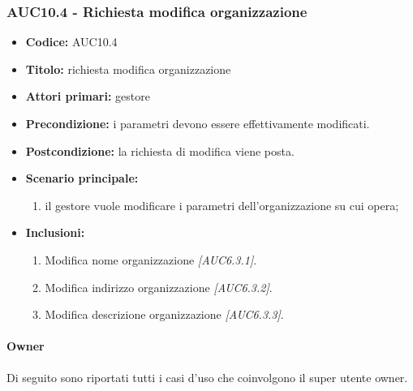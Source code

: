 \documentclass[casi-duso]{subfiles}
\begin{document}
\subsubsection{AUC10.4 - Richiesta modifica organizzazione}%
\label{subsub:AUC10.4}
\begin{itemize}
  \item \textbf{Codice:} AUC10.4
  \item \textbf{Titolo:} richiesta modifica organizzazione
  \item \textbf{Attori primari:} gestore
  \item \textbf{Precondizione:} i parametri devono essere effettivamente modificati.
  \item \textbf{Postcondizione:} la richiesta di modifica viene posta.
  \item \textbf{Scenario principale:}
  \begin{enumerate}
    \item il gestore vuole modificare i parametri dell'organizzazione su cui opera;
  \end{enumerate}
  \item \textbf{Inclusioni:}
  \begin{enumerate}
    \item Modifica nome organizzazione \emph{[AUC6.3.1]}.
    \item Modifica indirizzo organizzazione \emph{[AUC6.3.2]}.
    \item Modifica descrizione organizzazione \emph{[AUC6.3.3]}.
  \end{enumerate}
\end{itemize}

\paragraph{Owner}
Di seguito sono riportati tutti i casi d'uso che coinvolgono il super utente owner.
\end{document}
